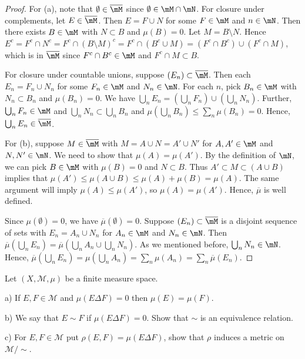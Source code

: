 \documentclass{article}
\begin{document}
\begin{proof}
For (a), note that $\emptyset \in \overline \mM$ since $\emptyset \in \mM \cap \mN$.  For closure under complements, let $E \in \overline \mM$.  Then $E  = F \cup N$ for some $F \in \mM$ and $n \in \mN$. Then there exists $B \in \mM$ with $N \subset B$ and $\mu(B) = 0$.  Let $M = B \setminus N$.  Hence $E^c = F^c \cap N^c = F^c \cap (B \setminus M)^c = F^c \cap (B^c \cup M) = (F^c \cap B^c) \cup (F^c \cap M)$, which is in $\overline \mM$ since $F^c \cap B^c \in \mM$ and $F^c \cap M \subset B$.  

For closure under countable unions, suppose $(E_n) \subset \overline \mM$.  Then each $E_n = F_n \cup N_n$ for some $F_n \in \mM$ and $N_n \in \mN$.
For each $n$, pick $B_n \in \mM$ with $N_n \subset B_n$ and $\mu(B_n) = 0$. We have $\bigcup_n E_n = (\bigcup_n F_n) \cup (\bigcup_n N_n)$. Further, $\bigcup_n F_n \in \mM$ and $\bigcup_n N_n \subset \bigcup_n B_n$ and $\mu(\bigcup_n B_n) \le \sum_n \mu(B_n) = 0$.  Hence, $\bigcup_n E_n \in \overline \mM$.

For (b), suppose $M \in \overline \mM$ with $M = A \cup N = A' \cup N'$ for $A, A' \in \mM$ and $N, N' \in \mN$.  We need to show that $\mu(A) = \mu(A')$.
By the definition of $\mN$, we can pick $B \in \mM$ with $\mu(B) = 0$ and $N \subset B$.  Thus $A' \subset M \subset (A \cup B)$ implies that $\mu(A') \le \mu(A \cup B) \le \mu(A) + \mu(B) = \mu(A)$.  The same argument will imply $\mu(A) \le \mu(A')$, so $\mu(A) = \mu(A')$. Hence, $\overline \mu$ is well defined.

Since $\mu(\emptyset) = 0$, we have $\overline \mu(\emptyset) = 0$. Suppose $(E_n) \subset \overline \mM$ is a disjoint sequence of sets with $E_n = A_n \cup N_n$ for $A_n \in \mM$ and $N_n \in \mN$.  Then $\overline \mu (\bigcup_n E_n) = \overline \mu( \bigcup_n A_n \cup \bigcup_n N_n)$.  As we mentioned before, $\bigcup_n N_n \in \mN$.  Hence, $\overline \mu (\bigcup_n E_n) = \mu(\bigcup_n A_n) = \sum_n \mu(A_n) = \sum_n \overline \mu (E_n)$.
\end{proof}

 Let $(X , \mathcal M, \mu)$ be a finite measure space. 

a) If $E, F \in \mathcal M$ and $\mu(E \Delta F) = 0$ then $\mu(E) = \mu(F)$.

b) We say that $E \sim F$ if $\mu (E \Delta F) = 0$. Show that $\sim$ is an equivalence relation.

c) For $E, F \in \mathcal M$ put $\rho(E, F) = \mu(E \Delta F)$, show that $\rho$ induces a metric on $\mathcal M / \sim$.
\end{document}
